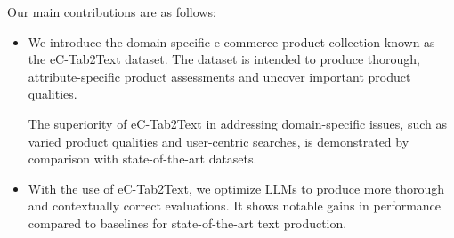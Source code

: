 Our main contributions are as follows: 

\begin{itemize}
    \item We introduce the domain-specific e-commerce product collection known as the eC-Tab2Text dataset. The dataset is intended to produce thorough, attribute-specific product assessments and uncover important product qualities.

    The superiority of eC-Tab2Text in addressing domain-specific issues, such as varied product qualities and user-centric searches, is demonstrated by comparison with state-of-the-art datasets.
    
    \item With the use of eC-Tab2Text, we optimize LLMs to produce more thorough and contextually correct evaluations. It shows notable gains in performance compared to baselines for state-of-the-art text production.
\end{itemize}
